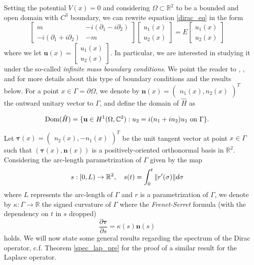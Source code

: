 Setting the potential \(V(x)=0\) and considering \(\Omega \subset \mathbb{R}^2\) to be a bounded and open domain with \(C^3\) boundary, we can rewrite equation \eqref{dirac_eq} in the form
\begin{equation}\label{dirac}
    \begin{bmatrix}
        m & -i(\partial_1 - i \partial_2)\\
        -i(\partial_1 + i \partial_2) & -m
    \end{bmatrix}
    \begin{bmatrix}
        u_1(x)\\
        u_2(x)
    \end{bmatrix}
    =E
    \begin{bmatrix}
    u_1(x)\\
    u_2(x)
    \end{bmatrix}
\end{equation}
where we let \(\mathbf{u}(x)=\begin{bmatrix}
    u_1(x)\\
    u_2(x)
    \end{bmatrix}\).
In particular, we are interested in studying it under the so-called \textit{infinite mass boundary conditions}. We point the reader to \cite{lotoreichik2019sharp}, \cite{briet2022spectral}, and \cite{antunes2021variational} for more details about this type of boundary conditions and the results below. For a point \(x \in \Gamma = \partial \Omega\), we denote by \(\mathbf{n}(x) = \begin{pmatrix}
    n_1(x), n_2(x)
\end{pmatrix}^T\) the outward unitary vector to \(\Gamma\), and define the domain of \(\hat{H}\) as

\[
\operatorname{Dom}(\hat{H}) = \{\mathbf{u} \in H^1(\Omega, \mathbb{C}^2): u_2 = i(n_1+i n_2)u_1 \text{ on } \Gamma\}.
\]

Let \(\boldsymbol{\tau}(x) = \begin{pmatrix}
    n_2(x), -n_1(x)
\end{pmatrix}^T\) be the unit tangent vector at point \(x \in \Gamma\) such that \((\boldsymbol{\tau}(x), \mathbf{n}(x))\) is a positively-oriented orthonormal basis in \(\mathbb{R}^2\). Considering the arc-length parametrization of \(\Gamma\) given by the map
\[
s: [0, L) \rightarrow \mathbb{R}^2, \quad s(t) = \int_0^t \norm{r'(\sigma)} d\sigma
\]
where \(L\) represents the arc-length of \(\Gamma\) and \(r\) is a parametrization of \(\Gamma\), we denote by \(\kappa:\Gamma \rightarrow \mathbb{R}\) the signed curvature of \(\Gamma\) where the \textit{Frenet-Serret} formula (with the dependency on \(t\) in \(s\) dropped)
\begin{equation}\label{dirac_frenet_serret}
    \frac{\partial\boldsymbol{\tau}}{\partial s}=\kappa(s)\mathbf{n}(s)
\end{equation}
holds. We will now state some general results regarding the spectrum of the Dirac operator, c.f. Theorem \ref{spec_lap_pre} for the proof of a similar result for the Laplace operator.

